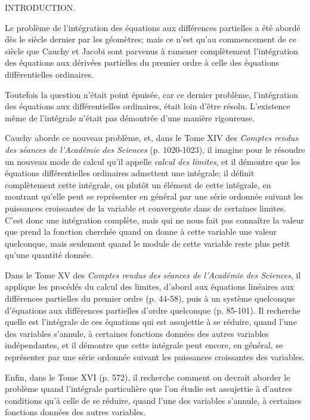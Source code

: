 \documentclass[11pt]{article}
\begin{document}
\begin{center}
{\large INTRODUCTION.}
\end{center}

Le problème de l'intégration des équations aux différences partielles a été abordé dès le siècle dernier par les géomètres; mais ce n'est qu'au commencement de ce siècle que Cauchy et Jacobi sont parvenus à ramener complètement l'intégration des équations aux dérivées partielles du premier ordre à celle des équations différentielles ordinaires.

Toutefois la question n'était point épuisée, car ce dernier problème, l'intégration des équations aux différentielles ordinaires, était loin d'être résolu. L'existence même de l'intégrale n'était pas démontrée d'une manière rigoureuse.

Cauchy aborde ce nouveau problème, et, dans le Tome XIV des \emph{Comptes rendus des séances de l'Académie des Sciences} (p. 1020-1023), il imagine pour le résoudre un nouveau mode de calcul qu'il appelle \emph{calcul des limites}, et il démontre que les équations différentielles ordinaires admettent une intégrale; il définit complètement cette intégrale, ou plutôt un élément de cette intégrale, en montrant qu'elle peut se représenter en général par une série ordonnée suivant les puissances croissantes de la variable et convergente dans de certaines limites. C'est donc une intégration complète, mais qui ne nous fait pas connaître la valeur que prend la fonction cherchée quand on donne à cette variable une valeur quelconque, mais seulement quand le module de cette variable reste plus petit qu'une quantité donnée.

Dans le Tome XV des \emph{Comptes rendus des séances de l'Académie des Sciences}, il applique les procédés du calcul des limites, d'abord aux équations linéaires aux différences partielles du premier ordre (p. 44-58), puis à un système quelconque d'équations aux différences partielles d'ordre quelconque (p. 85-101). Il recherche quelle est l'intégrale de ces équations qui est assujettie à se réduire, quand l'une des variables s'annule, à certaines fonctions données des autres variables indépendantes, et il démontre que cette intégrale peut encore, en général, se représenter par une série ordonnée suivant les puissances croissantes des variables.

Enfin, dans le Tome XVI (p. 572), il recherche comment on devrait aborder le problème quand l'intégrale particulière que l'on étudie est assujettie à d'autres conditions qu'à celle de se réduire, quand l'une des variables s'annule, à certaines fonctions données des autres variables.
\end{document}
